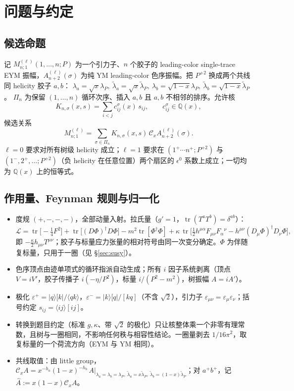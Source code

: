 \documentclass[11pt,a4paper]{ctexart}
\newcommand{\ang}[1]{\langle #1\rangle}
\newcommand{\sq}[1]{[#1]}
\newcommand{\Cx}{\mathcal C_x}
\newcommand{\Q}{\mathbb Q}
\newcommand{\tr}{\operatorname{tr}}
\newcommand{\hA}{\widehat A}
\theoremstyle{definition}
\theoremstyle{remark}
\begin{document}
\section{问题与约定}
\subsection{候选命题}
记 $M^{(\ell)}_{n;1}(1,\dots,n;P)$ 为一个引力子、$n$ 个胶子的 leading-color single-trace EYM 振幅，$A^{(\ell)}_{n+2}(\sigma)$ 为纯 YM leading-color 色序振幅。把 $P^{+2}$ 换成两个共线同 helicity 胶子 $a,b$：
$\lambda_a=\sqrt x\lambda_P,\ \tilde\lambda_a=\sqrt x\tilde\lambda_P,\ \lambda_b=\sqrt{1-x}\lambda_P,\ \tilde\lambda_b=\sqrt{1-x}\tilde\lambda_P$。
$\Pi_n$ 为保留 $(1,\dots,n)$ 循环次序、插入 $a,b$ 且 $a,b$ 不相邻的排序。允许核
\begin{equation}
K_{n,\sigma}(x,s)=\sum_{i<j}c^\sigma_{ij}(x)\,s_{ij},\qquad c^\sigma_{ij}\in\Q(x),
\end{equation}
候选关系
\begin{equation}\label{eq:Q1}
M^{(\ell)}_{n;1}=\sum_{\sigma\in\Pi_n}K_{n,\sigma}(x,s)\,\Cx A^{(\ell)}_{n+2}(\sigma). \tag{Q1}
\end{equation}
$\ell=0$ 要求对所有树级 helicity 成立；$\ell=1$ 要求在 $(1^+\cdots n^+;P^{+2})$ 与 $(1^-,2^+,\dots;P^{+2})$（负 helicity 在任意位置）两个扇区的 $\epsilon^0$ 系数上成立；一切均为 $\Q(x)$ 上的恒等式。

\subsection{作用量、Feynman 规则与归一化}
\begin{itemize}
\item 度规 $(+,-,-,-)$，全部动量入射。拉氏量（$g'=1$，$\tr(T^aT^b)=\delta^{ab}$）：
\[
\mathcal L=\tr\!\big[-\tfrac14F^2\big]+\tr\big[(D\Phi)^\dagger D\Phi\big]-m^2\tr[\Phi^\dagger\Phi]
+\kappa\,\tr\!\big[\tfrac12h^{\mu\alpha}F_{\mu\nu}F_\alpha{}^\nu-h^{\mu\nu}(D_\mu\Phi)^\dagger D_\nu\Phi\big],
\]
即 $-\tfrac{\kappa}{2}h_{\mu\nu}T^{\mu\nu}$；胶子与标量应力张量的相对符号由同一次变分确定。$\Phi$ 为伴随复标量，只用于一圈（见 \S\ref{sec:susy}）。
\item 色序顶点由迹单项式的循环指派自动生成；所有 $i$ 因子系统剥离（顶点 $V=iV'$，胶子传播子 $i(-\eta/P^2)$，标量 $i/(P^2-m^2)$，树振幅 $A=iA'$）。
\item 极化 $\varepsilon^+=|q\rangle[k|/\ang{qk}$，$\varepsilon^-=|k\rangle[q|/\sq{kq}$（不含 $\sqrt2$），引力子 $\varepsilon_{\mu\nu}=\varepsilon_\mu\varepsilon_\nu$；括号约定 $s_{ij}=\ang{ij}\sq{ij}$。
\item 转换到题目约定（标准 $g,\kappa$、带 $\sqrt2$ 的极化）只让核整体乘一个非零有理常数，且树与一圈相同，不影响任何秩与相容性结论。一圈量剥去 $1/16\pi^2$，取复标量的一个荷流方向（EYM 与 YM 相同）。
\item 共线取值：由 little group，$\Cx A=x^{-h_a}(1-x)^{-h_b}\,A\big|_{\lambda_a=\lambda_b=\lambda_P,\ \tilde\lambda_a=x\tilde\lambda_P,\ \tilde\lambda_b=(1-x)\tilde\lambda_P}$；对 $a^+b^+$，记 $\hA:=x(1-x)\Cx A$。
\end{itemize}
\end{document}

